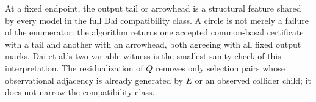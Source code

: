 At a fixed endpoint, the output tail or arrowhead is a structural feature shared by every model in the full Dai compatibility class.  A circle is not merely a failure of the enumerator: the algorithm returns one accepted common-basal certificate with a tail and another with an arrowhead, both agreeing with all fixed output marks.  Dai et al.'s two-variable witness is the smallest sanity check of this interpretation.  The residualization of \(Q\) removes only selection pairs whose observational adjacency is already generated by \(E\) or an observed collider child; it does not narrow the compatibility class.